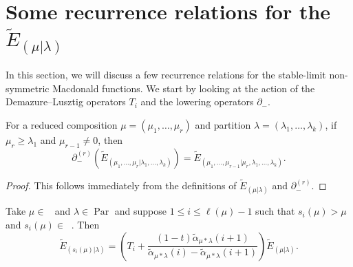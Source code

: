 \documentclass[ALCO,Unicode]{cedram}
\DeclareMathOperator{\Par}{\mathrm{Par}}
\DeclareMathOperator{\Compred}{\mathrm{Comp}^{\textit{red}}}
\begin{document}
\section{Some recurrence relations for the \texorpdfstring{$\widetilde{E}_{(\mu|\lambda)}$}{E\_(mu | lambda)}}\label{recurrence relations section}

In this section, we will discuss a few recurrence relations for the stable-limit non-symmetric Macdonald functions. We start by looking at the action of the Demazure--Lusztig operators $T_i$ and the lowering operators $\partial_{-}$.

\begin{prop}
    For a reduced composition $\mu = (\mu_1,\ldots,\mu_r)$ and partition $\lambda =(\lambda_1,\ldots,\lambda_k)$, if $\mu_r \geq \lambda_1$ and $\mu_{r-1} \neq 0$, then 
    \begin{equation}
        \partial_{-}^{(r)} \left( \widetilde{E}_{(\mu_1,\ldots,\mu_r|\lambda_1,\ldots,\lambda_k)} \right) = \widetilde{E}_{(\mu_1,\ldots,\mu_{r-1}|\mu_r,\lambda_1,\ldots,\lambda_k)}.
    \end{equation}
\end{prop}
\begin{proof}
    This follows immediately from the definitions of $\widetilde{E}_{(\mu|\lambda)}$ and $\partial_{-}^{(r)}.$
\end{proof}

\begin{prop}
Take $\mu \in \Compred$ and $\lambda \in \Par$ and suppose $1\leq i \leq \ell(\mu) -1$ such that $s_i(\mu) > \mu$ and $s_i(\mu) \in \Compred.$  Then 
\begin{equation}
    \widetilde{E}_{(s_i(\mu)|\lambda)} = 
  \left( T_i + \frac{(1-t)\widetilde{\alpha}_{\mu*\lambda}(i+1)}{\widetilde{\alpha}_{\mu*\lambda}(i)- \widetilde{\alpha}_{\mu*\lambda}(i+1)} \right)  \widetilde{E}_{(\mu|\lambda)}.
\end{equation}
\end{prop}
\end{document}
